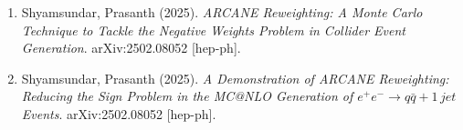 \documentclass[12pt,lettersize,oneside]{book} %
\begin{document}
\begin{talk}
\begin{enumerate}
    \item[{[1]}] Shyamsundar, Prasanth (2025). {\it ARCANE Reweighting: A Monte Carlo Technique to Tackle the Negative Weights Problem in Collider Event Generation}. arXiv:2502.08052 [hep-ph].
    \item[{[2]}] Shyamsundar, Prasanth (2025). {\it A Demonstration of ARCANE Reweighting: Reducing the Sign Problem in the MC@NLO Generation of $e^+ e^- \longrightarrow q\bar{q} + 1\,jet$ Events}. arXiv:2502.08052 [hep-ph].
\end{enumerate}

\end{talk}
\end{document}

